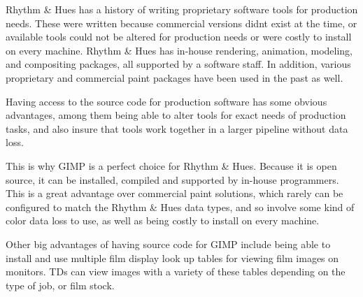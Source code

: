 Rhythm \& Hues has a history of writing proprietary software tools for
production needs. These were written because commercial versions didnt exist at
the time, or available tools could not be altered for production needs or were
costly to install on every machine. Rhythm \& Hues has in-house rendering,
animation, modeling, and compositing packages, all supported by a software
staff. In addition, various proprietary and commercial paint packages have been
used in the past as well.

Having access to the source code for production software has some obvious
advantages, among them being able to alter tools for exact needs of production
tasks, and also insure that tools work together in a larger pipeline without
data loss.

This is why GIMP is a perfect choice for Rhythm \& Hues. Because it is open
source, it can be installed, compiled and supported by in-house programmers.
This is a great advantage over commercial paint solutions, which rarely can be
configured to match the Rhythm \& Hues data types, and so involve some kind of
color data loss to use, as well as being costly to install on every machine.

Other big advantages of having source code for GIMP include being able to
install and use multiple film display look up tables for viewing film images on
monitors. TDs can view images with a variety of these tables depending on the
type of job, or film stock.
